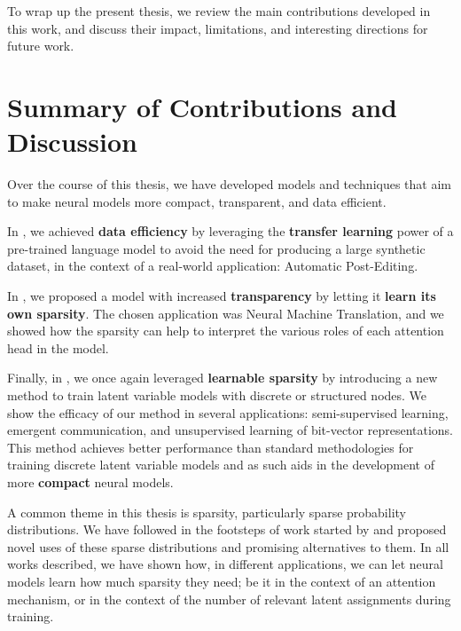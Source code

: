 \label{chap:conclusions}

\cleardoublepage
\doublespacing

To wrap up the present thesis, we review the main contributions
developed in this work, and discuss their impact, limitations, and
interesting directions for future work.

\section{Summary of Contributions and Discussion}

Over the course of this thesis, we have developed models and
techniques that aim to make neural models more compact, transparent,
and data efficient.

In , we achieved \textbf{data efficiency} by
leveraging the \textbf{transfer learning} power of a pre-trained
language model to avoid the need for producing a large synthetic
dataset, in the context of a real-world application: Automatic
Post-Editing.

In , we proposed a model with increased
\textbf{transparency} by letting it \textbf{learn its own sparsity}.
The chosen application was Neural Machine Translation, and we showed
how the sparsity can help to interpret the various roles of each
attention head in the model.

Finally, in , we once again leveraged
\textbf{learnable sparsity} by introducing a new method to train
latent variable models with discrete or structured nodes. We show the
efficacy of our method in several applications: semi-supervised
learning, emergent communication, and unsupervised learning of
bit-vector representations. This method achieves better performance
than standard methodologies for training discrete latent variable
models and as such aids in the development of more \textbf{compact}
neural models.

A common theme in this thesis is sparsity, particularly
sparse probability distributions. We have followed in the footsteps
of work started by \citet{sparsemax} and proposed novel uses of
these sparse distributions and promising alternatives to them.
In all works described, we have shown how, in different applications,
we can let neural models learn how much sparsity they need; be it
in the context of an attention mechanism, or in the context of
the number of relevant latent assignments during training.

